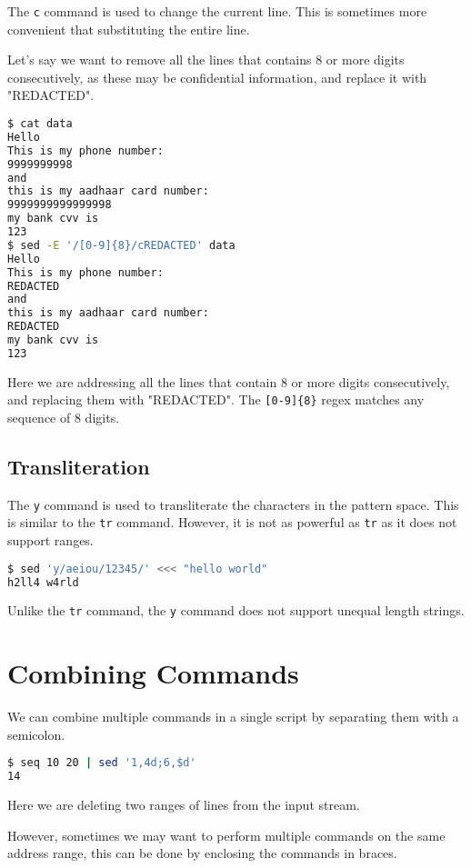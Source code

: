 The \lstinline|c| command is used to change the current line.
This is sometimes more convenient that substituting the entire line.

Let's say we want to remove all the lines that contains $8$ or more digits consecutively, as these may be confidential information, and replace it with "REDACTED".

\begin{lstlisting}[language=bash]
$ cat data
Hello
This is my phone number:
9999999998
and
this is my aadhaar card number:
9999999999999998
my bank cvv is
123
$ sed -E '/[0-9]{8}/cREDACTED' data
Hello
This is my phone number:
REDACTED
and
this is my aadhaar card number:
REDACTED
my bank cvv is
123
\end{lstlisting}

Here we are addressing all the lines that contain $8$ or more digits consecutively, and replacing them with "REDACTED".
The \lstinline|[0-9]{8}| regex matches any sequence of $8$ digits.

\subsection{Transliteration}

The \lstinline|y| command is used to transliterate the characters in the pattern space.
This is similar to the \lstinline|tr| command.
However, it is not as powerful as \lstinline|tr| as it does not support ranges.

\begin{lstlisting}[language=bash]
$ sed 'y/aeiou/12345/' <<< "hello world"
h2ll4 w4rld
\end{lstlisting}

Unlike the \lstinline|tr| command, the \lstinline|y| command does not support unequal length strings.

\section{Combining Commands}

We can combine multiple commands in a single script by separating them with a semicolon.

\begin{lstlisting}[language=bash]
$ seq 10 20 | sed '1,4d;6,$d'
14
\end{lstlisting}

Here we are deleting two ranges of lines from the input stream.

However, sometimes we may want to perform multiple commands on the same address range,
this can be done by enclosing the commands in braces.


